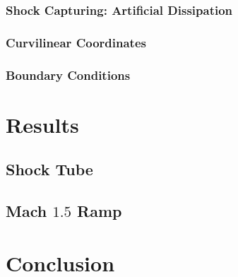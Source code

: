 \documentclass[paper=a4, fontsize=11pt]{scrartcl}
\numberwithin{equation}{section}        %
\numberwithin{figure}{section}          %
\numberwithin{table}{section}               %
\begin{document}
\subsubsection{Shock Capturing: Artificial Dissipation}

\subsubsection{Curvilinear Coordinates}

\subsubsection{Boundary Conditions}


\section{Results}
\subsection{Shock Tube}

\subsection{Mach $1.5$ Ramp}

\section{Conclusion}
\end{document}
